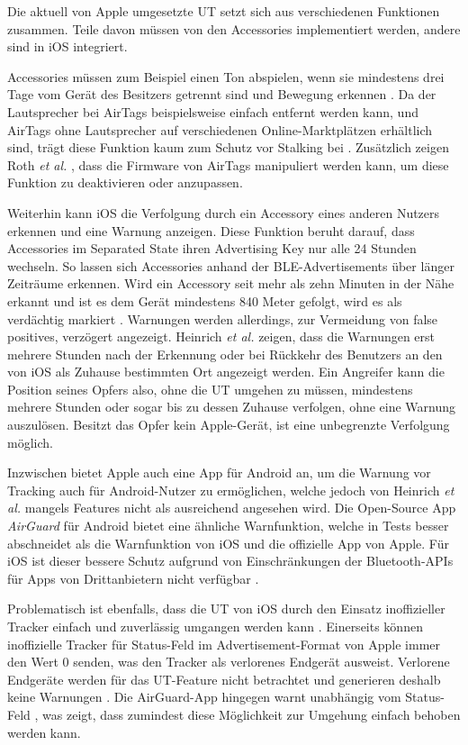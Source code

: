 Die aktuell von Apple umgesetzte \ac{UT} setzt sich aus verschiedenen Funktionen zusammen.
Teile davon müssen von den Accessories implementiert werden, andere sind in iOS integriert.

Accessories müssen zum Beispiel einen Ton abspielen, wenn sie mindestens drei Tage vom Gerät des Besitzers getrennt sind und Bewegung erkennen \cite{Apple_FindMySpec}.
Da der Lautsprecher bei AirTags beispielsweise einfach entfernt werden kann, und AirTags ohne Lautsprecher auf verschiedenen Online-Marktplätzen erhältlich sind, trägt diese Funktion kaum zum Schutz vor Stalking bei \cite{Heinrich_AirGuard}.
Zusätzlich zeigen Roth \textit{et al.} \cite{Roth_airtags}, dass die Firmware von AirTags manipuliert werden kann, um diese Funktion zu deaktivieren oder anzupassen.

Weiterhin kann iOS die Verfolgung durch ein Accessory eines anderen Nutzers erkennen und eine Warnung anzeigen.
Diese Funktion beruht darauf, dass Accessories im Separated State ihren Advertising Key nur alle 24 Stunden wechseln.
So lassen sich Accessories anhand der \ac{BLE}-Advertisements über länger Zeiträume erkennen.
Wird ein Accessory seit mehr als zehn Minuten in der Nähe erkannt und ist es dem Gerät mindestens 840 Meter gefolgt, wird es als verdächtig markiert \cite{Heinrich_AirGuard}.
Warnungen werden allerdings, zur Vermeidung von false positives, verzögert angezeigt.
Heinrich \textit{et al.} \cite{Heinrich_AirGuard} zeigen, dass die Warnungen erst mehrere Stunden nach der Erkennung oder bei Rückkehr des Benutzers an den von iOS als Zuhause bestimmten Ort angezeigt werden.
Ein Angreifer kann die Position seines Opfers also, ohne die \ac{UT} umgehen zu müssen, mindestens mehrere Stunden oder sogar bis zu dessen Zuhause verfolgen, ohne eine Warnung auszulösen.
Besitzt das Opfer kein Apple-Gerät, ist eine unbegrenzte Verfolgung möglich.

Inzwischen bietet Apple auch eine App für Android an, um die Warnung vor Tracking auch für Android-Nutzer zu ermöglichen, welche jedoch von Heinrich \textit{et al.} \cite{Heinrich_AirGuard} mangels Features nicht als ausreichend angesehen wird.
Die Open-Source App \textit{AirGuard} für Android bietet eine ähnliche Warnfunktion, welche in Tests besser abschneidet als die Warnfunktion von iOS und die offizielle App von Apple.
Für iOS ist dieser bessere Schutz aufgrund von Einschränkungen der Bluetooth-\acp{API} für Apps von Drittanbietern nicht verfügbar \cite{Heinrich_AirGuard}.

Problematisch ist ebenfalls, dass die \ac{UT} von iOS durch den Einsatz inoffizieller Tracker einfach und zuverlässig umgangen werden kann \cite{Heinrich_AirGuard,Mayberry_Tracking}.
Einerseits können inoffizielle Tracker für Status-Feld im Advertisement-Format von Apple immer den Wert 0 senden, was den Tracker als verlorenes Endgerät ausweist.
Verlorene Endgeräte werden für das \ac{UT}-Feature nicht betrachtet und generieren deshalb keine Warnungen \cite{Heinrich_AirGuard,Mayberry_Tracking}.
Die AirGuard-App hingegen warnt unabhängig vom Status-Feld \cite{Heinrich_AirGuard}, was zeigt, dass zumindest diese Möglichkeit zur Umgehung einfach behoben werden kann.

